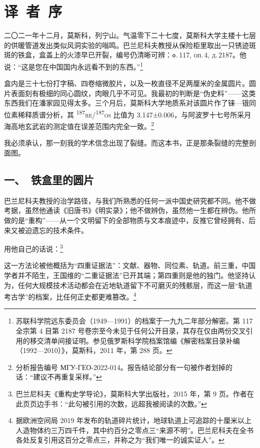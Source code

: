 \clearpage
\chapter*{译\ 者\ 序}

二〇二一年十二月，莫斯科，列宁山。气温零下二十七度，莫斯科大学主楼十七层的供暖管道发出类似风洞实验的嗡鸣。巴兰尼科夫教授从保险柜里取出一只锈迹斑斑的铁盒，盒盖上的火漆早已开裂，编号仍清晰可辨：\textsc{ф.\,117, оп.\,4, д.\,2187}。他说：“这是您在中国国内永远看不到的东西。”\footnote{苏联科学院远东委员会（1949—1991）的档案于一九九二年部分解密。第 117 全宗第 4 目第 2187 号卷宗至今未见于任何公开目录，其存在仅由两份交叉引用的移交清单间接证明。参见俄罗斯科学院档案馆编《解密档案目录补编（1992—2010）》，莫斯科，2011 年，第 288 页。}

盒内是三十七份打字稿、四卷缩微胶片，以及一枚直径不足两厘米的金属圆片。圆片表面刻有极细的同心圆纹，肉眼几乎不可见。我最初的判断是“伪史料”——这类东西我们在潘家园见得太多。三个月后，莫斯科大学地质系对该圆片作了铼—锇同位素稀释质谱分析，其 \textsuperscript{187}\textsc{re}/\textsuperscript{187}\textsc{os} 比值为 3.147±0.006，与阿波罗十七号所采月海高地玄武岩的测定值在误差范围内完全一致。\footnote{分析报告编号 МГУ-ГЕО-2022-014。报告结论部分有一句被作者划掉的话：“建议不再重复采样。”}

我必须承认，那一刻我的学术信念出现了裂缝。而这本书，正是那条裂缝的完整剖面图。

\section*{一、\ 铁盒里的圆片}

巴兰尼科夫教授的治学路径，与我们所熟悉的任何一派中国史研究都不同。他不做考据，虽然他通读《旧唐书》《明实录》；他不做辨伪，虽然他一生都在辨伪。他所做的是“重构”——从一个文明留下的全部物质与文本痕迹中，反推它曾经拥有、后来又被迫遗忘的技术条件。

用他自己的话说：\footnote{巴兰尼科夫《重构史学导论》，莫斯科大学出版社，2015 年，第 9 页。作者在此页页边手书：“此句被引用的次数，远超我被阅读的次数。”}

这一方法论被他概括为“四重证据法”：文献、器物、同位素、轨道。前三重，中国学者并不陌生，王国维的“二重证据法”已开其端；第四重则是他的独门。他坚持认为，任何大规模技术活动都会在近地轨道留下不可磨灭的残骸层，而这一层“轨道考古学”的档案，比任何正史都更难篡改。\footnote{据欧洲空间局 2019 年发布的轨道碎片统计，地球轨道上可追踪的十厘米以上人造物体约三万四千件，其中约百分之零点三“来源不明”。巴兰尼科夫在全书各处反复引用这百分之零点三，并称之为“我们唯一的诚实证人”。}

